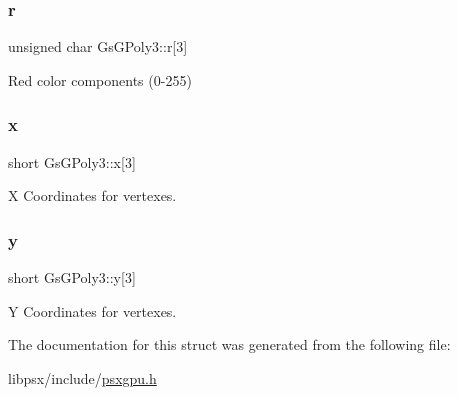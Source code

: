 \subsubsection{\texorpdfstring{r}{r}}
{\footnotesize\ttfamily unsigned char Gs\+G\+Poly3\+::r\mbox{[}3\mbox{]}}



Red color components (0-\/255) 

\mbox{\label{structGsGPoly3_aa88c14cf01a721462df4032ea1daa1b6}} 
\subsubsection{\texorpdfstring{x}{x}}
{\footnotesize\ttfamily short Gs\+G\+Poly3\+::x\mbox{[}3\mbox{]}}



X Coordinates for vertexes. 

\mbox{\label{structGsGPoly3_aff8727e5b3a6d62fd51e0e62a214fb58}} 
\subsubsection{\texorpdfstring{y}{y}}
{\footnotesize\ttfamily short Gs\+G\+Poly3\+::y\mbox{[}3\mbox{]}}



Y Coordinates for vertexes. 



The documentation for this struct was generated from the following file\+:\begin{DoxyCompactItemize}
\item 
libpsx/include/\hyperlink{psxgpu_8h}{psxgpu.\+h}\end{DoxyCompactItemize}
